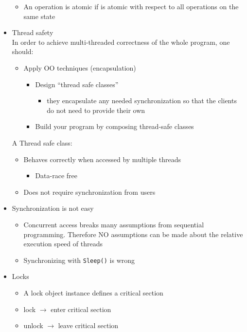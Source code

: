 \documentclass[a4paper]{article}
\newcommand{\inline}[1]{\lstinline!#1!}%
\begin{document}
\begin{itemize}
\begin{itemize}
\begin{itemize}
					\end{itemize}
				\item An operation is atomic if is atomic with respect to all operations on the same state
 			\end{itemize}	
 		\item Thread safety
 			\\In order to achieve multi-threaded correctness of the whole program, one should:	
 			\begin{itemize}
 				\item Apply OO techniques (encapsulation)
 					\begin{itemize}
 						\item Design ``thread safe classes''
 							\begin{itemize}
 								\item they encapsulate any needed synchronization so that the clients do not need to provide their own
 							\end{itemize}
 						\item Build your program by composing thread-safe classes
 					\end{itemize}
 			\end{itemize}
 			A Thread safe class:
 				\begin{itemize}
 					\item Behaves correctly when accessed by multiple threads
 						\begin{itemize}
 							\item Data-race free
 						\end{itemize}
 					\item Does not require synchronization from users
 				\end{itemize}
 			\item Synchronization is not easy
 				\begin{itemize}
 					\item Concurrent access breaks many assumptions from sequential programming. Therefore NO assumptions can be made about the relative execution speed of threads
 					\item Synchronizing with \inline{Sleep()} is wrong 
 				\end{itemize}
 			\item Locks
 				\begin{itemize}
 					\item A lock object instance defines a critical section
 					\item lock $\to$ enter critical section
 					\item unlock $\to$ leave critical section

\end{itemize}
\end{itemize}
\end{document}
